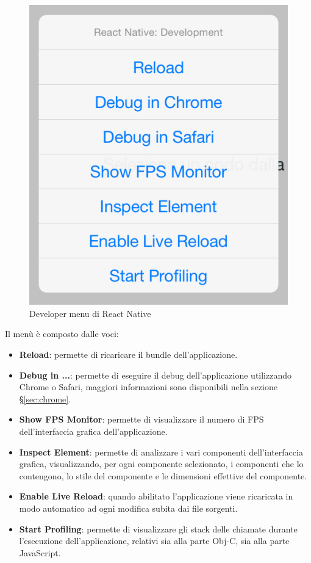 \begin{figure}[htp]
\centering
\includegraphics[width=\textwidth*1/3]{../immagini/rn-devmenu}
\caption{Developer menu di React Native}  
\end{figure}

Il menù è composto dalle voci:
\begin{itemize}
\item \textbf{Reload}: permette di ricaricare il bundle dell'applicazione.
\item \textbf{Debug in ...}: permette di eseguire il debug dell'applicazione utilizzando Chrome o Safari, maggiori informazioni sono disponibili nella sezione §\ref{sec:chrome}.
\item \textbf{Show FPS Monitor}: permette di visualizzare il numero di \gls{FPS} dell'interfaccia grafica dell'applicazione.
\item \textbf{Inspect Element}: permette di analizzare i vari componenti dell'interfaccia grafica, visualizzando, per ogni componente selezionato, i componenti che lo contengono, lo stile del componente e le dimensioni effettive del componente.
\item \textbf{Enable Live Reload}: quando abilitato l'applicazione viene ricaricata in modo automatico ad ogni modifica subita dai file sorgenti.
\item \textbf{Start Profiling}: permette di visualizzare gli stack delle chiamate durante l'esecuzione dell'applicazione, relativi sia alla parte Obj-C, sia alla parte JavaScript. 
\end{itemize}

